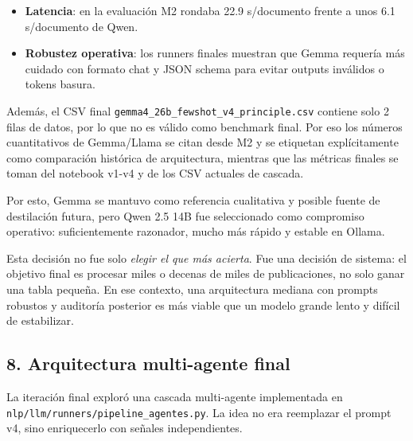 \begin{itemize}
\item \textbf{Latencia}: en la evaluación M2 rondaba 22.9 s/documento frente a unos 6.1 s/documento de Qwen.
\item \textbf{Robustez operativa}: los runners finales muestran que Gemma requería más cuidado con formato chat y JSON schema para evitar outputs inválidos o tokens basura.
\end{itemize}

Además, el CSV final \texttt{gemma4\_26b\_fewshot\_v4\_principle.csv} contiene solo 2 filas de datos, por lo que no es válido como benchmark final. Por eso los números cuantitativos de Gemma/Llama se citan desde M2 y se etiquetan explícitamente como comparación histórica de arquitectura, mientras que las métricas finales se toman del notebook v1-v4 y de los CSV actuales de cascada.

Por esto, Gemma se mantuvo como referencia cualitativa y posible fuente de destilación futura, pero Qwen 2.5 14B fue seleccionado como compromiso operativo: suficientemente razonador, mucho más rápido y estable en Ollama.

Esta decisión no fue solo \emph{elegir el que más acierta}. Fue una decisión de sistema: el objetivo final es procesar miles o decenas de miles de publicaciones, no solo ganar una tabla pequeña. En ese contexto, una arquitectura mediana con prompts robustos y auditoría posterior es más viable que un modelo grande lento y difícil de estabilizar.

\subsection{8. Arquitectura multi-agente final}

La iteración final exploró una cascada multi-agente implementada en \texttt{nlp/llm/runners/pipeline\_agentes.py}. La idea no era reemplazar el prompt v4, sino enriquecerlo con señales independientes.



